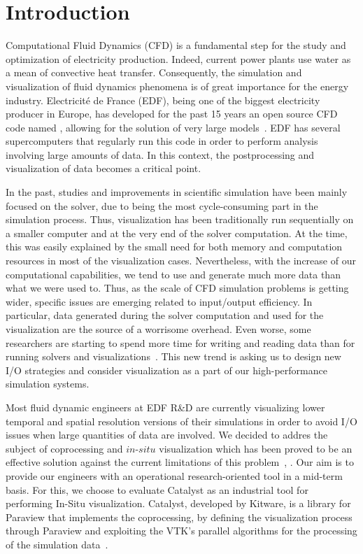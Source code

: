 \section{Introduction}
Computational Fluid Dynamics (CFD) is a fundamental step for the study and
optimization of electricity production. Indeed, current power plants use water
as a mean of convective heat transfer.  Consequently, the simulation and
visualization of fluid dynamics phenomena is of great importance for the energy
industry. Electricité de France (EDF), being one of the biggest electricity producer in Europe, has
developed for the past 15 years an open source CFD code named \CS,
allowing for the solution of very large models~\cite{5644955}. EDF has
several supercomputers that regularly run this code in order to perform
analysis involving large amounts of data. In this context, the postprocessing
and visualization of data becomes a critical point. 

In the past, studies and improvements in scientific simulation have been mainly
focused on the solver, due to being the most cycle-consuming part in the
simulation process. Thus, visualization has been traditionally run sequentially
on a smaller computer and at the very end of the solver computation. At the
time, this was easily explained by the small need for both memory and
computation resources in most of the visualization cases. Nevertheless, with the
increase of our computational capabilities, we tend to use and generate much
more data than what we were used to. Thus, as the scale of CFD simulation
problems is getting wider, specific issues are emerging related to input/output
efficiency. In particular, data generated during the solver computation and
used for the visualization are the source of a worrisome overhead. Even worse,
some researchers are starting to spend more time for writing and reading data
than for running solvers and visualizations~\cite{1742-6596-125-1-012099}.
This new trend is asking us to design new I/O strategies and consider
visualization as a part of our high-performance simulation systems.


Most fluid dynamic engineers at EDF R\&D are currently visualizing lower temporal and spatial 
resolution versions of their simulations in order to avoid I/O issues when large quantities of data are involved.
We decided to addres the subject of coprocessing and $in$-$situ$
visualization which has been proved to be an effective solution against the current
limitations of this problem~\cite{sandiareport}, \cite{4090186}. Our aim is to provide 
our engineers with an operational research-oriented tool in a mid-term basis.
For this, we choose to evaluate Catalyst as an industrial tool for performing In-Situ visualization. 
Catalyst, developed by Kitware, is a library for Paraview that implements the
coprocessing, by defining the visualization process through Paraview and
exploiting the VTK's parallel algorithms for the processing of the simulation
data~\cite{6092322}. 

